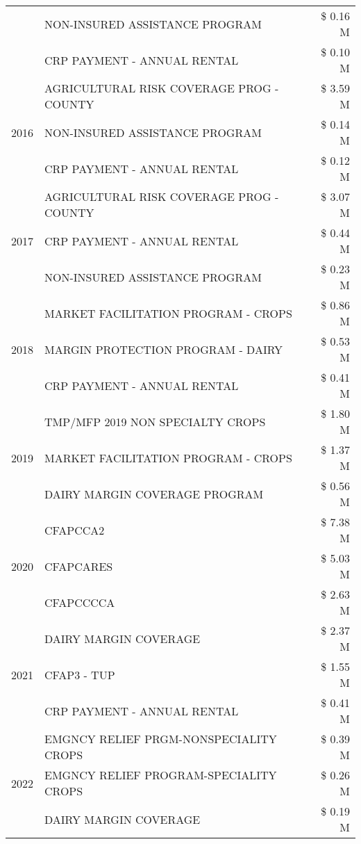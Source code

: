 \begin{tabular}{llr}
 & NON-INSURED ASSISTANCE PROGRAM & \$ 0.16 M \\
 & CRP PAYMENT - ANNUAL RENTAL & \$ 0.10 M \\
\cline{1-3}
\multirow[t]{3}{*}{2016} & AGRICULTURAL RISK COVERAGE PROG - COUNTY & \$ 3.59 M \\
 & NON-INSURED ASSISTANCE PROGRAM & \$ 0.14 M \\
 & CRP PAYMENT - ANNUAL RENTAL & \$ 0.12 M \\
\cline{1-3}
\multirow[t]{3}{*}{2017} & AGRICULTURAL RISK COVERAGE PROG - COUNTY & \$ 3.07 M \\
 & CRP PAYMENT - ANNUAL RENTAL & \$ 0.44 M \\
 & NON-INSURED ASSISTANCE PROGRAM & \$ 0.23 M \\
\cline{1-3}
\multirow[t]{3}{*}{2018} & MARKET FACILITATION PROGRAM - CROPS & \$ 0.86 M \\
 & MARGIN PROTECTION PROGRAM - DAIRY & \$ 0.53 M \\
 & CRP PAYMENT - ANNUAL RENTAL & \$ 0.41 M \\
\cline{1-3}
\multirow[t]{3}{*}{2019} & TMP/MFP 2019 NON SPECIALTY CROPS & \$ 1.80 M \\
 & MARKET FACILITATION PROGRAM - CROPS & \$ 1.37 M \\
 & DAIRY MARGIN COVERAGE PROGRAM & \$ 0.56 M \\
\cline{1-3}
\multirow[t]{3}{*}{2020} & CFAPCCA2 & \$ 7.38 M \\
 & CFAPCARES & \$ 5.03 M \\
 & CFAPCCCCA & \$ 2.63 M \\
\cline{1-3}
\multirow[t]{3}{*}{2021} & DAIRY MARGIN COVERAGE & \$ 2.37 M \\
 & CFAP3 - TUP & \$ 1.55 M \\
 & CRP PAYMENT - ANNUAL RENTAL & \$ 0.41 M \\
\cline{1-3}
\multirow[t]{3}{*}{2022} & EMGNCY RELIEF PRGM-NONSPECIALITY CROPS & \$ 0.39 M \\
 & EMGNCY RELIEF PROGRAM-SPECIALITY CROPS & \$ 0.26 M \\
 & DAIRY MARGIN COVERAGE & \$ 0.19 M \\
\cline{1-3}
\bottomrule
\end{tabular}
